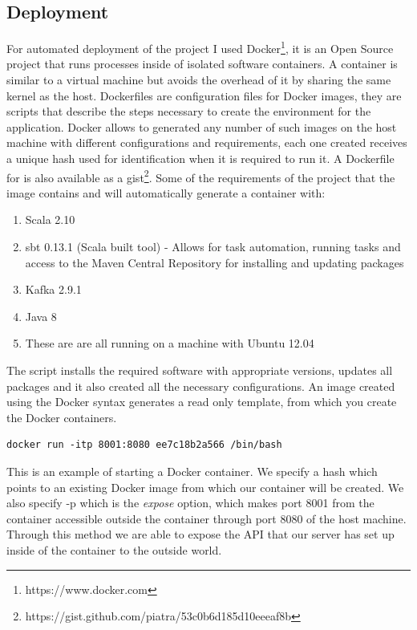 \subsection{Deployment}
\label{deployment}
For automated deployment of the project I used Docker\footnote{https://www.docker.com}, it is an Open Source project that runs processes inside of isolated software containers. A container is similar to a virtual machine but avoids the overhead of it by sharing the same kernel as the host. Dockerfiles are configuration files for Docker images, they are scripts that describe the steps necessary to create the environment for the application. Docker allows to generated any number of such images on the host machine with different configurations and requirements, each one created receives a unique hash used for identification when it is required to run it. A Dockerfile for \project  is also available as a gist\footnote{https://gist.github.com/piatra/53c0b6d185d10eeeaf8b}. Some of the requirements of the project that the image contains and will automatically generate a container with:
\begin{enumerate}
	\item Scala 2.10
	\item sbt 0.13.1 (Scala built tool) - Allows for task automation, running tasks and access to the Maven Central Repository for installing and updating packages 
	\item Kafka 2.9.1
	\item Java 8
	\item These are are all running on a machine with Ubuntu 12.04
\end{enumerate}
The script installs the required software with appropriate versions, updates all packages and it also created all the necessary configurations.
An image created using the Docker syntax generates a read only template, from which you create the Docker containers.
\begin{lstlisting}[caption=Starting a Docker container, label=run_docker_container]
docker run -itp 8001:8080 ee7c18b2a566 /bin/bash
\end{lstlisting}
This is an example of starting a Docker container. We specify a hash which points to an existing Docker image from which our container will be created. We also specify -p which is the \textit{expose} option, which makes port 8001 from the container accessible outside the container through port 8080 of the host machine. Through this method we are able to expose the API that our server has set up inside of the container to the outside world.
